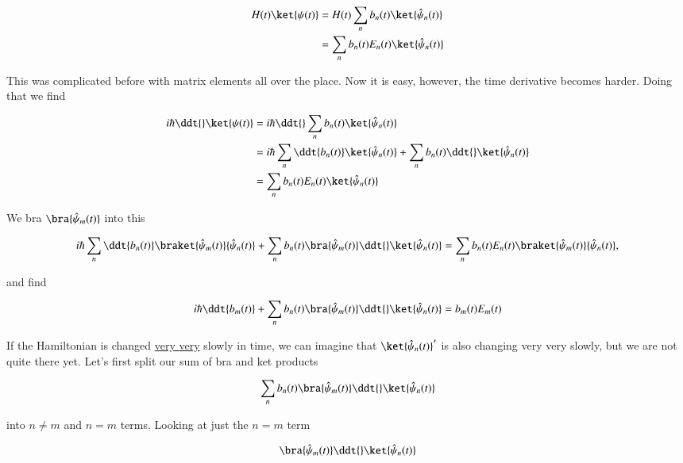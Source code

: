 \begin{align*}
H(t) \ket{\psi(t)} 
&= H(t) \sum_n b_n(t) \ket{\hat{\psi}_n(t)} \\
&= \sum_n b_n(t) E_n(t) \ket{\hat{\psi}_n(t)} 
\end{align*}

This was complicated before with matrix elements all over the place.  Now it is easy, however, the time derivative becomes harder.  Doing that we find

\begin{align*}
i \hbar \ddt{} \ket{\psi(t)}
&=
i \hbar
\ddt{} \sum_n b_n(t) \ket{\hat{\psi}_n(t)} \\
&=
i \hbar
\sum_n 
\ddt{b_n(t)} \ket{\hat{\psi}_n(t)} 
+ \sum_n b_n(t) \ddt{} \ket{\hat{\psi}_n(t)} \\
&= \sum_n b_n(t) E_n(t) \ket{\hat{\psi}_n(t)} 
\end{align*}

We bra $\bra{\hat{\psi}_m(t)}$ into this

\begin{equation}\label{eqn:qmTwoL8:400}
i \hbar
\sum_n 
\ddt{b_n(t)} 
\braket{\hat{\psi}_m(t)}{\hat{\psi}_n(t)}
+ \sum_n b_n(t) 
\bra{\hat{\psi}_m(t)}
\ddt{} \ket{\hat{\psi}_n(t)} 
= \sum_n b_n(t) E_n(t) \braket{\hat{\psi}_m(t)}{\hat{\psi}_n(t)} ,
\end{equation}

and find

\begin{equation}\label{eqn:qmTwoL8:410}
i \hbar
\ddt{b_m(t)} 
+ 
\sum_n b_n(t) 
\bra{\hat{\psi}_m(t)}
\ddt{} \ket{\hat{\psi}_n(t)} 
= b_m(t) E_m(t) 
\end{equation}

If the Hamiltonian is changed \underline{very very} slowly in time, we can imagine that $\ket{\hat{\psi}_n(t)}'$ is also changing very very slowly, but we are not quite there yet.  Let's first split our sum of bra and ket products 

\begin{equation}\label{eqn:qmTwoL8:430}
\sum_n b_n(t) 
\bra{\hat{\psi}_m(t)}
\ddt{} \ket{\hat{\psi}_n(t)} 
\end{equation}

into $n \ne m$ and $n = m$ terms.  Looking at just the $n = m$ term 

\begin{equation}\label{eqn:qmTwoL8:450}
\bra{\hat{\psi}_m(t)}
\ddt{} \ket{\hat{\psi}_n(t)} 
\end{equation}

